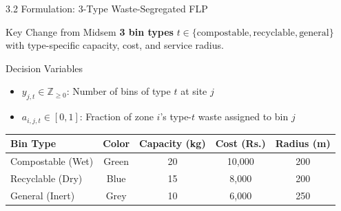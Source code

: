\documentclass[aspectratio=169]{beamer}
\begin{document}
\begin{frame}{3.2 Formulation: 3-Type Waste-Segregated FLP}
    \begin{block}{Key Change from Midsem}
        \textbf{3 bin types} $t \in \{\text{compostable}, \text{recyclable}, \text{general}\}$ with type-specific capacity, cost, and service radius.
    \end{block}
    \begin{exampleblock}{Decision Variables}
        \begin{itemize}
            \item $y_{j,t} \in \mathbb{Z}_{\ge 0}$: Number of bins of type $t$ at site $j$
            \item $a_{i,j,t} \in [0,1]$: Fraction of zone $i$'s type-$t$ waste assigned to bin $j$
        \end{itemize}
    \end{exampleblock}

    \begin{table}
        \centering\footnotesize
        \begin{tabular}{l c c c c}
            \toprule
            \textbf{Bin Type} & \textbf{Color} & \textbf{Capacity (kg)} & \textbf{Cost (Rs.)} & \textbf{Radius (m)} \\ \midrule
            \rowcolor{green!15} Compostable (Wet) & Green & 20 & 10{,}000 & 200 \\
            \rowcolor{blue!10} Recyclable (Dry) & Blue & 15 & 8{,}000 & 200 \\
            \rowcolor{gray!15} General (Inert) & Grey & 10 & 6{,}000 & 250 \\
            \bottomrule
        \end{tabular}
    \end{table}
\end{frame}
\end{document}
